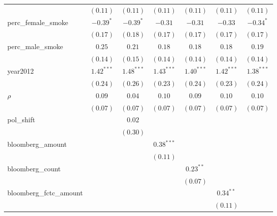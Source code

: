 \begin{table}[!h]
\begin{center}
\begin{tabular}{l c c c c c c }
                        & $(0.11)$     & $(0.11)$     & $(0.11)$     & $(0.11)$     & $(0.11)$     & $(0.11)$     \\
perc\_female\_smoke     & $-0.39^{*}$  & $-0.39^{*}$  & $-0.31$      & $-0.31$      & $-0.33$      & $-0.34^{*}$  \\
                        & $(0.17)$     & $(0.18)$     & $(0.17)$     & $(0.17)$     & $(0.17)$     & $(0.17)$     \\
perc\_male\_smoke       & $0.25$       & $0.21$       & $0.18$       & $0.18$       & $0.18$       & $0.19$       \\
                        & $(0.14)$     & $(0.15)$     & $(0.14)$     & $(0.14)$     & $(0.14)$     & $(0.14)$     \\
year2012                & $1.42^{***}$ & $1.48^{***}$ & $1.43^{***}$ & $1.40^{***}$ & $1.42^{***}$ & $1.38^{***}$ \\
                        & $(0.24)$     & $(0.26)$     & $(0.23)$     & $(0.24)$     & $(0.23)$     & $(0.24)$     \\
$\rho$                  & $0.09$       & $0.04$       & $0.10$       & $0.09$       & $0.10$       & $0.10$       \\
                        & $(0.07)$     & $(0.07)$     & $(0.07)$     & $(0.07)$     & $(0.07)$     & $(0.07)$     \\
pol\_shift              &              & $0.02$       &              &              &              &              \\
                        &              & $(0.30)$     &              &              &              &              \\
bloomberg\_amount       &              &              & $0.38^{***}$ &              &              &              \\
                        &              &              & $(0.11)$     &              &              &              \\
bloomberg\_count        &              &              &              & $0.23^{**}$  &              &              \\
                        &              &              &              & $(0.07)$     &              &              \\
bloomberg\_fctc\_amount &              &              &              &              & $0.34^{**}$  &              \\
                        &              &              &              &              & $(0.11)$     &              \\

\end{tabular}
\end{center}
\end{table}

